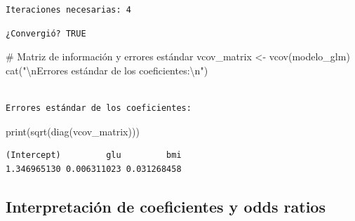 \documentclass[
  letterpaper,
  DIV=11,
  numbers=noendperiod]{scrreprt}
\newenvironment{Shaded}{\begin{snugshade}}{\end{snugshade}}
\newcommand{\CommentTok}[1]{\textcolor[rgb]{0.37,0.37,0.37}{#1}}
\newcommand{\FunctionTok}[1]{\textcolor[rgb]{0.28,0.35,0.67}{#1}}
\newcommand{\NormalTok}[1]{\textcolor[rgb]{0.00,0.23,0.31}{#1}}
\newcommand{\OtherTok}[1]{\textcolor[rgb]{0.00,0.23,0.31}{#1}}
\newcommand{\SpecialCharTok}[1]{\textcolor[rgb]{0.37,0.37,0.37}{#1}}
\newcommand{\StringTok}[1]{\textcolor[rgb]{0.13,0.47,0.30}{#1}}
\begin{document}
\begin{tcolorbox}
\begin{verbatim}
Iteraciones necesarias: 4 
\end{verbatim}

\begin{Shaded}
\end{Shaded}

\begin{verbatim}
¿Convergió? TRUE 
\end{verbatim}

\begin{Shaded}
\begin{Highlighting}[]
\CommentTok{\# Matriz de información y errores estándar}
\NormalTok{vcov\_matrix }\OtherTok{\textless{}{-}} \FunctionTok{vcov}\NormalTok{(modelo\_glm)}
\FunctionTok{cat}\NormalTok{(}\StringTok{"}\SpecialCharTok{\textbackslash{}n}\StringTok{Errores estándar de los coeficientes:}\SpecialCharTok{\textbackslash{}n}\StringTok{"}\NormalTok{)}
\end{Highlighting}
\end{Shaded}

\begin{verbatim}

Errores estándar de los coeficientes:
\end{verbatim}

\begin{Shaded}
\begin{Highlighting}[]
\FunctionTok{print}\NormalTok{(}\FunctionTok{sqrt}\NormalTok{(}\FunctionTok{diag}\NormalTok{(vcov\_matrix)))}
\end{Highlighting}
\end{Shaded}

\begin{verbatim}
(Intercept)         glu         bmi 
1.346965130 0.006311023 0.031268458 
\end{verbatim}

\end{tcolorbox}

\subsection{Interpretación de coeficientes y odds
ratios}\label{interpretaciuxf3n-de-coeficientes-y-odds-ratios}
\end{document}
